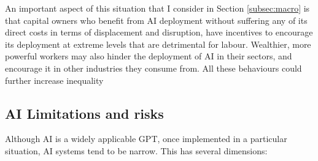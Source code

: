 \documentclass[11pt]{article}
\begin{document}
An important aspect of this situation that I consider in Section \ref{subsec:macro} is that capital owners who benefit from AI deployment without suffering any of its direct costs in terms of displacement and disruption, have incentives to encourage its deployment at extreme levels that are detrimental for labour. Wealthier, more powerful workers may also hinder the deployment of AI in their sectors, and encourage it in other industries they consume from. All these behaviours could further increase inequality

\subsection{AI Limitations and risks}
\label{subsec:limits}
Although AI is a widely applicable GPT, once implemented in a particular situation, AI systems tend to be narrow. This has several dimensions:
\end{document}
